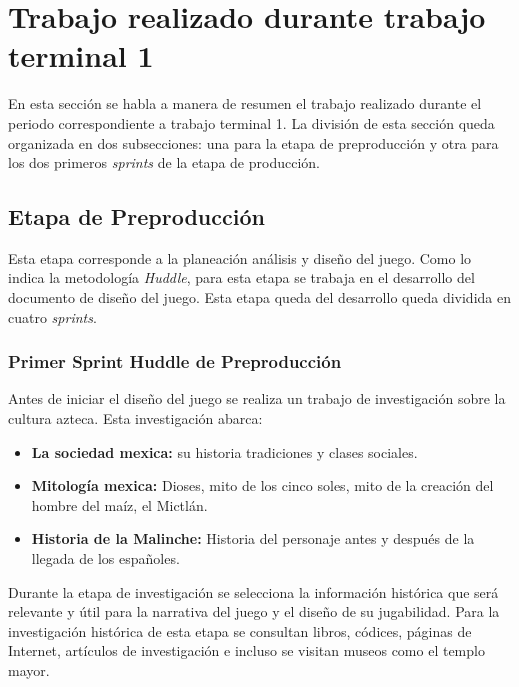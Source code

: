 \section{Trabajo realizado durante trabajo terminal 1} \label{TrabajoTerminal1}

En esta sección se habla a manera de resumen el trabajo realizado durante el
periodo correspondiente a trabajo terminal 1. La división de esta sección
queda organizada en dos subsecciones: una para la etapa de preproducción y
otra para los dos primeros \textit{sprints} de la etapa de producción.



\subsection{Etapa de Preproducción}\label{EtapaPreproduccion}
Esta etapa corresponde a la planeación análisis y diseño del juego. Como lo indica
la metodología \textit{Huddle}, para esta etapa se trabaja en el desarrollo del
documento de diseño del juego. Esta etapa queda del desarrollo queda dividida en
cuatro \textit{sprints}.

\subsubsection{Primer Sprint Huddle de Preproducción}\label{Prepro01}
Antes de iniciar el diseño del juego se realiza un trabajo de investigación
sobre la cultura azteca. Esta investigación abarca:
\begin{itemize}
        \item \textbf{La sociedad mexica:} su historia tradiciones y clases sociales.
        \item \textbf{Mitología mexica:} Dioses, mito de los cinco soles, mito de la
        creación del hombre del maíz, el Mictlán.
        \item \textbf{Historia de la Malinche:} Historia del personaje antes y después
        de la llegada de los españoles.
\end{itemize}
 
Durante la etapa de investigación se selecciona la información histórica que
será relevante y útil para la narrativa del juego y el diseño de su jugabilidad.
Para la investigación histórica de esta etapa se consultan libros, códices,
páginas de Internet, artículos de investigación e incluso se visitan museos
como el templo mayor.

